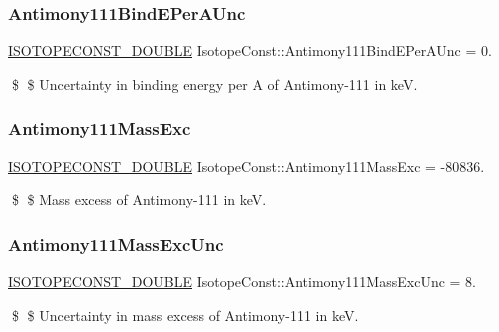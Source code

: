 \subsubsection{\texorpdfstring{Antimony111\+Bind\+E\+Per\+A\+Unc}{Antimony111BindEPerAUnc}}
{\footnotesize\ttfamily \mbox{\hyperlink{group___isotope_const-_macros_ga8f45a7272ce02c0b4c65c44636ed719a}{I\+S\+O\+T\+O\+P\+E\+C\+O\+N\+S\+T\+\_\+\+D\+O\+U\+B\+LE}} Isotope\+Const\+::\+Antimony111\+Bind\+E\+Per\+A\+Unc = 0.}

\$ \$ Uncertainty in binding energy per A of Antimony-\/111 in keV. \mbox{\label{group___isotope_const-_antimony-_sb111_ga917f7daf451c0db4d7d1668861325ff3}} 
\subsubsection{\texorpdfstring{Antimony111\+Mass\+Exc}{Antimony111MassExc}}
{\footnotesize\ttfamily \mbox{\hyperlink{group___isotope_const-_macros_ga8f45a7272ce02c0b4c65c44636ed719a}{I\+S\+O\+T\+O\+P\+E\+C\+O\+N\+S\+T\+\_\+\+D\+O\+U\+B\+LE}} Isotope\+Const\+::\+Antimony111\+Mass\+Exc = -\/80836.}

\$ \$ Mass excess of Antimony-\/111 in keV. \mbox{\label{group___isotope_const-_antimony-_sb111_ga768194bd39a807edbee19ece25e6f7cb}} 
\subsubsection{\texorpdfstring{Antimony111\+Mass\+Exc\+Unc}{Antimony111MassExcUnc}}
{\footnotesize\ttfamily \mbox{\hyperlink{group___isotope_const-_macros_ga8f45a7272ce02c0b4c65c44636ed719a}{I\+S\+O\+T\+O\+P\+E\+C\+O\+N\+S\+T\+\_\+\+D\+O\+U\+B\+LE}} Isotope\+Const\+::\+Antimony111\+Mass\+Exc\+Unc = 8.}

\$ \$ Uncertainty in mass excess of Antimony-\/111 in keV. \mbox{\label{group___isotope_const-_antimony-_sb111_ga6eb1f0bec9076d45c9d559551d5ceef4}} 
